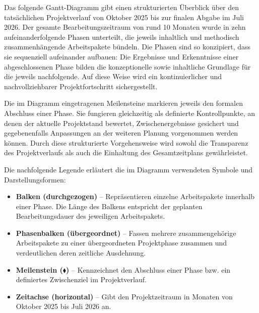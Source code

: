\label{ch:projektmanagement}

 
Das folgende Gantt-Diagramm gibt einen strukturierten Überblick über den tatsächlichen Projektverlauf von Oktober 2025 bis zur finalen Abgabe im Juli 2026. Der gesamte Bearbeitungszeitraum von rund 10 Monaten wurde in zehn aufeinanderfolgende Phasen unterteilt, die jeweils inhaltlich und methodisch zusammenhängende Arbeitspakete bündeln. Die Phasen sind so konzipiert, dass sie sequenziell aufeinander aufbauen: Die Ergebnisse und Erkenntnisse einer abgeschlossenen Phase bilden die konzeptionelle sowie inhaltliche Grundlage für die jeweils nachfolgende. Auf diese Weise wird ein kontinuierlicher und nachvollziehbarer Projektfortschritt sichergestellt.
 
Die im Diagramm eingetragenen Meilensteine markieren jeweils den formalen Abschluss einer Phase. Sie fungieren gleichzeitig als definierte Kontrollpunkte, an denen der aktuelle Projektstand bewertet, Zwischenergebnisse gesichert und gegebenenfalls Anpassungen an der weiteren Planung vorgenommen werden können. Durch diese strukturierte Vorgehensweise wird sowohl die Transparenz des Projektverlaufs als auch die Einhaltung des Gesamtzeitplans gewährleistet.
 
Die nachfolgende Legende erläutert die im Diagramm verwendeten Symbole und Darstellungsformen:
 
\begin{itemize}
  \item \textbf{Balken (durchgezogen)} – Repräsentieren einzelne Arbeitspakete innerhalb einer Phase. Die Länge des Balkens entspricht der geplanten Bearbeitungsdauer des jeweiligen Arbeitspakets.
  \item \textbf{Phasenbalken (übergeordnet)} – Fassen mehrere zusammengehörige Arbeitspakete zu einer übergeordneten Projektphase zusammen und verdeutlichen deren zeitliche Ausdehnung.
  \item \textbf{Meilenstein ($\blacklozenge$)} – Kennzeichnet den Abschluss einer Phase bzw. ein definiertes Zwischenziel im Projektverlauf.
  \item \textbf{Zeitachse (horizontal)} – Gibt den Projektzeitraum in Monaten von Oktober 2025 bis Juli 2026 an.
\end{itemize}
 
